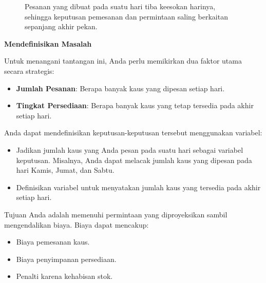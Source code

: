 \begin{figure}[h]
\centering
{}
\caption{Pesanan yang dibuat pada suatu hari tiba keesokan harinya, sehingga keputusan pemesanan dan permintaan saling berkaitan sepanjang akhir pekan.}
\label{fig:shirt-timeline}
\end{figure}

\textbf{Mendefinisikan Masalah}

Untuk menangani tantangan ini, Anda perlu memikirkan dua faktor utama secara strategis:

\begin{itemize}
    \item \textbf{Jumlah Pesanan}: Berapa banyak kaus yang dipesan setiap hari.
    \item \textbf{Tingkat Persediaan}: Berapa banyak kaus yang tetap tersedia pada akhir setiap hari.
\end{itemize}

Anda dapat mendefinisikan keputusan-keputusan tersebut menggunakan variabel:
\begin{itemize}
    \item Jadikan jumlah kaus yang Anda pesan pada suatu hari sebagai variabel keputusan. Misalnya, Anda dapat melacak jumlah kaus yang dipesan pada hari Kamis, Jumat, dan Sabtu.
    \item Definisikan variabel untuk menyatakan jumlah kaus yang tersedia pada akhir setiap hari.
\end{itemize}

Tujuan Anda adalah memenuhi permintaan yang diproyeksikan sambil mengendalikan biaya. Biaya dapat mencakup:
\begin{itemize}
    \item Biaya pemesanan kaus.
    \item Biaya penyimpanan persediaan.
    \item Penalti karena kehabisan stok.
\end{itemize}

